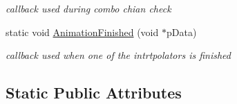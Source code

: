 \begin{DoxyCompactItemize}
\begin{DoxyCompactList}\small\item\em callback used during combo chian check \end{DoxyCompactList}\item 
\hypertarget{class_game_logic_a9f965a420651cc37aa083a46338212f5}{static void \hyperlink{class_game_logic_a9f965a420651cc37aa083a46338212f5}{Animation\-Finished} (void $\ast$p\-Data)}\label{class_game_logic_a9f965a420651cc37aa083a46338212f5}

\begin{DoxyCompactList}\small\item\em callback used when one of the intrtpolators is finished \end{DoxyCompactList}\end{DoxyCompactItemize}
\subsection*{Static Public Attributes}

